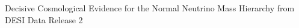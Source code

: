 \documentclass[]{article}
\begin{document}
Decisive Cosmological Evidence for the Normal Neutrino Mass Hierarchy from DESI Data Release 2
\end{document}
